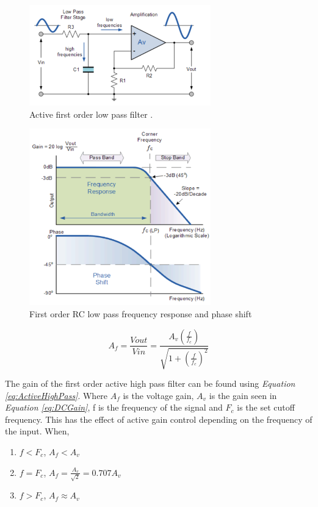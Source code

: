 \begin{figure}[h]
    \centering
    \includegraphics[width=0.70\textwidth]{graphics/lowPassFilter.png}
    \caption{Active first order low pass filter \cite{noauthor_active_2013-1}.}
    \label{fig:LowPassFilter}
\end{figure}

\begin{figure}[h]
    \centering
    \includegraphics[width=0.70\textwidth]{graphics/lowPassResponse.png}
    \caption{First order RC low pass frequency response and phase shift \cite{noauthor_low_2013}}
    \label{fig:LowPassResponse}
\end{figure}


\begin{equation}
    A_f = \frac{V{out}}{V{in}} = \frac{A_v(\frac{f}{f_c})}{\sqrt{1 + (\frac{f}{f_c})^2}}
    \label{eq:ActiveHighPass}
\end{equation}

The gain of the first order active high pass filter can be found using \textit{Equation \ref{eq:ActiveHighPass}}.
Where $A_f$ is the voltage gain, $A_v$ is the gain seen in \textit{Equation \ref{eq:DCGain}}, f is the frequency of the signal and $F_c$ is the set cutoff frequency.
This has the effect of active gain control depending on the frequency of the input.
When,
\begin{enumerate}
    \item $f < F_c$, $A_f < A_v$
    \item $f = F_c$, $A_f = \frac{A_v}{\sqrt{2}} = 0.707 A_v$
    \item$f > F_c$, $A_f \approx A_v$
\end{enumerate}


